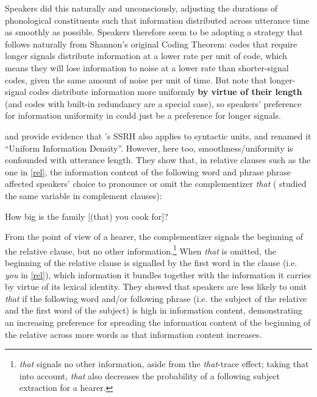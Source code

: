 \documentclass[12pt]{article}
\begin{document}
Speakers did this naturally and unconsciously, adjusting the durations of phonological constituents such that information distributed across utterance time as smoothly as possible. Speakers therefore seem to be adopting a strategy that follows naturally from Shannon's original Coding Theorem: codes that require longer signals distribute information at a lower rate per unit of code, which means they will lose information to noise at a lower rate than shorter-signal codes, given the same amount of noise per unit of time. But note that longer-signal codes distribute information more uniformly \textbf{by virtue of their length} (and codes with built-in redundancy are a special case), so speakers' preference for information uniformity in \citet{aylettturk2004} could just be a preference for longer signals.

\citet{levyjaeger2007} and \citet{jaeger2010} provide evidence that \citet{aylettturk2004}'s SSRH also applies to syntactic units, and renamed it ``Uniform Information Density''. However, here too, smoothness/uniformity is confounded with utterance length.  They show that, in relative clauses such as the one in \ref{rel}, the information content of the following word and phrase phrase affected speakers' choice to pronounce or omit the complementizer \textsl{that} (\citealt{jaeger2010} studied the same variable in complement clauses):

\begin{exe}
\ex \label{rel} How big is the family $[$(that) you cook for$]$?
\end{exe}

\noindent From the point of view of a hearer, the complementizer signals the beginning of the relative clause, but no other information.\footnote{\textsl{that} signals no other information, aside from the \textsl{that}-trace effect; taking that into account, \textsl{that} also decreases the probability of a following subject extraction for a hearer.} When \textsl{that} is omitted, the beginning of the relative clause is signalled by the first word in the clause (i.e. \textsl{you} in \ref{rel}), which information it bundles together with the information it carries by virtue of its lexical identity. They showed that speakers are less likely to omit \textsl{that} if the following word and/or following phrase (i.e. the subject of the relative and the first word of the subject) is high in information content, demonstrating an increasing preference for spreading the information content of the beginning of the relative across more words as that information content increases.
\end{document}
